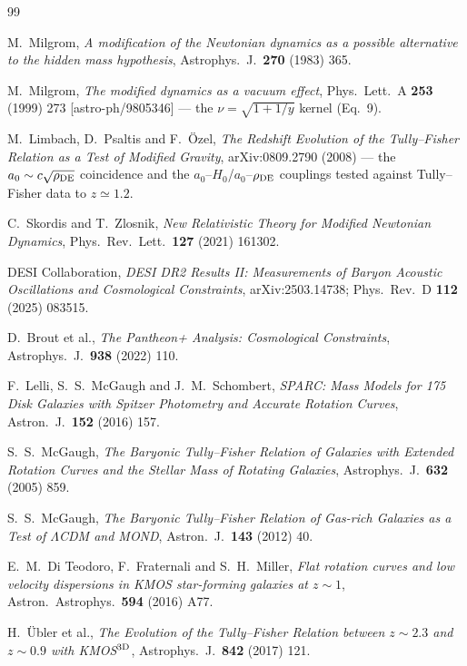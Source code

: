\documentclass[11pt,a4paper]{article}
\newcommand{\rhoDE}{\rho_{\rm DE}}
\newcommand{\azero}{a_0}
\begin{document}
\begin{thebibliography}{99}

 M.~Milgrom,
\emph{A modification of the Newtonian dynamics as a possible alternative to
the hidden mass hypothesis}, Astrophys.\ J.\ \textbf{270} (1983) 365.

 M.~Milgrom,
\emph{The modified dynamics as a vacuum effect},
Phys.\ Lett.\ A \textbf{253} (1999) 273 [astro-ph/9805346] ---
the $\nu=\sqrt{1+1/y}$ kernel (Eq.~9).

 M.~Limbach, D.~Psaltis and F.~\"Ozel,
\emph{The Redshift Evolution of the Tully--Fisher Relation as a Test of
Modified Gravity}, arXiv:0809.2790 (2008) --- the $\azero\sim c\sqrt{\rhoDE}$
coincidence and the $\azero$--$H_0$/$\azero$--$\rhoDE$ couplings tested
against Tully--Fisher data to $z\simeq1.2$.

 C.~Skordis and T.~Zlosnik,
\emph{New Relativistic Theory for Modified Newtonian Dynamics},
Phys.\ Rev.\ Lett.\ \textbf{127} (2021) 161302.

 DESI Collaboration,
\emph{DESI DR2 Results II: Measurements of Baryon Acoustic Oscillations and
Cosmological Constraints}, arXiv:2503.14738; Phys.\ Rev.\ D \textbf{112}
(2025) 083515.

 D.~Brout et al.,
\emph{The Pantheon+ Analysis: Cosmological Constraints},
Astrophys.\ J.\ \textbf{938} (2022) 110.

 F.~Lelli, S.~S.~McGaugh and J.~M.~Schombert,
\emph{SPARC: Mass Models for 175 Disk Galaxies with Spitzer Photometry and
Accurate Rotation Curves}, Astron.\ J.\ \textbf{152} (2016) 157.

 S.~S.~McGaugh,
\emph{The Baryonic Tully--Fisher Relation of Galaxies with Extended Rotation
Curves and the Stellar Mass of Rotating Galaxies},
Astrophys.\ J.\ \textbf{632} (2005) 859.

 S.~S.~McGaugh,
\emph{The Baryonic Tully--Fisher Relation of Gas-rich Galaxies as a Test of
$\Lambda$CDM and MOND}, Astron.\ J.\ \textbf{143} (2012) 40.

 E.~M.~Di Teodoro, F.~Fraternali and S.~H.~Miller,
\emph{Flat rotation curves and low velocity dispersions in KMOS star-forming
galaxies at $z\sim1$}, Astron.\ Astrophys.\ \textbf{594} (2016) A77.

 H.~\"Ubler et al.,
\emph{The Evolution of the Tully--Fisher Relation between $z\sim2.3$ and
$z\sim0.9$ with KMOS$^{3\rm D}$}, Astrophys.\ J.\ \textbf{842} (2017) 121.


\end{thebibliography}
\end{document}
